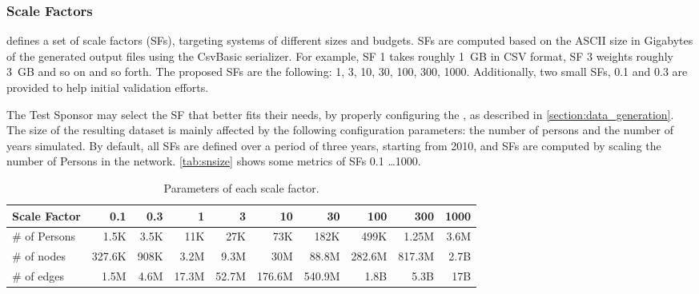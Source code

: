 \subsubsection{Scale Factors}

\ldbcsnb defines a set of scale factors (SFs), targeting systems of different sizes and budgets.
SFs are computed based on the ASCII size in Gigabytes of the generated output files using the CsvBasic serializer.
For example, SF 1 takes roughly 1~GB in CSV format, SF 3 weights roughly 3~GB and so on and so forth.
The proposed SFs are the following: 1, 3, 10, 30, 100, 300, 1000.
Additionally, two small SFs, 0.1 and 0.3 are provided to help initial validation efforts.

The Test Sponsor may select the SF that better fits their needs, by properly configuring the \datagen, as described in \autoref{section:data_generation}.
The size of the resulting dataset is mainly affected by the following configuration parameters: the number of persons and the number of years simulated.
By default, all SFs are defined over a period of three years, starting from 2010, and SFs are computed by scaling the number of Persons in the network.
\autoref{tab:snsize} shows some metrics of SFs 0.1 \ldots 1000.

\begin{table}[H]
	\centering
	\begin{tabular}{|l||r|r|r|r|r|r|r|r|r|}
		\hline
		Scale Factor     &     0.1 &     0.3 &        1 &        3 &        10 &        30 &        100 &        300 &        1000 \\ \hline\hline
		\# of Persons    &    1.5K &    3.5K &      11K &      27K &       73K &      182K &       499K &      1.25M &        3.6M \\ \hline\hline
		\# of nodes      &  327.6K &    908K &     3.2M &     9.3M &       30M &     88.8M &     282.6M &     817.3M &        2.7B \\ \hline
		\# of edges      &    1.5M &    4.6M &    17.3M &    52.7M &    176.6M &    540.9M &       1.8B &       5.3B &         17B \\ \hline
	\end{tabular}
	\centering
	\caption{Parameters of each scale factor.}
	\label{tab:snsize}
\end{table}

